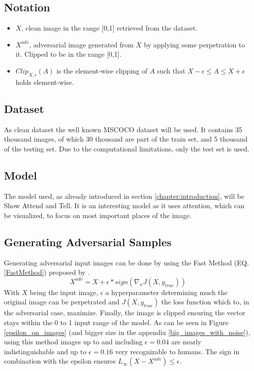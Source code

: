 \subsection{Notation}
\begin{itemize}
    \item $X$, clean image in the range [0,1] retrieved from the dataset.
    \item $X^{adv}$, adversarial image generated from $X$ by applying some perpetration to it. Clipped to be in the range [0,1].
    \item $Clip_{X,\epsilon}(A)$ is the element-wise clipping of $A$ such that $X -\epsilon \leq A \leq X + \epsilon$ holds element-wise.
\end{itemize}

\subsection{Dataset}
As clean dataset the well known MSCOCO \cite{lin2015microsoft} dataset will be used. It contains 35 thousand images, of which 30 thousand are part of the train set, and 5 thousand of the testing set. Due to the computational limitations, only the test set is used.

\subsection{Model}
The model used, as already introduced in section \ref{chapter:introduction}, will be Show Attend and Tell. It is an interesting model as it uses attention, which can be visualized, to focus on most important places of the image.

\subsection{Generating Adversarial Samples}
Generating adversarial input images can be done by using the Fast Method (EQ. \ref{FastMethod}) proposed by \citeauthor{goodfellow2015explaining}.
\begin{equation}
    X^{adv} = X + \epsilon * sign(\nabla_{x}J(X, y_{true}))
    \label{FastMethod}
\end{equation}
With $X$ being the input image, $\epsilon$ a hyperparameter determining much the original image can be perpetrated and $J(X, y_{true})$ the loss function which to, in the adversarial case, maximize. Finally, the image is clipped ensuring the vector stays within the 0 to 1 input range of the model. As can be seen in Figure \ref{epsilon_on_images} (and bigger size in the appendix \ref{big_images_with_noise}), using this method images up to and including $\epsilon=0.04$ are nearly indistinguishable and up to $\epsilon=0.16$ very recognizable to humans. The sign in combination with the epsilon ensures $L_{\infty}(X - X^{adv}) \leq \epsilon$.

